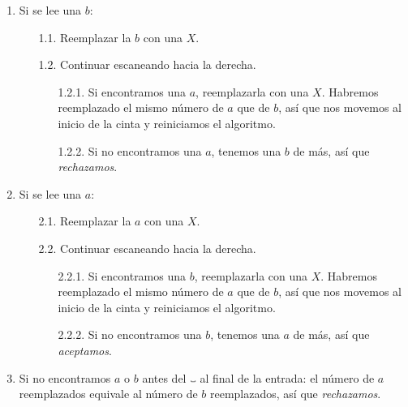 \begin{ejemplo}
\begin{enumerate}
    \item Si se lee una $b$:
        \begin{enumerate}
            \item[1.1.] Reemplazar la $b$ con una $X$.
            \item[1.2.] Continuar escaneando hacia la derecha.
            \begin{enumerate}
                \item[1.2.1.] Si encontramos una $a$, reemplazarla con una $X$. Habremos reemplazado el mismo número de $a$ que de $b$, así que nos movemos al inicio de la cinta y reiniciamos el algoritmo.
                \item[1.2.2.] Si no encontramos una $a$, tenemos una $b$ de más, así que \textit{rechazamos}.
            \end{enumerate}
        \end{enumerate}
    \item Si se lee una $a$:
        \begin{enumerate}
            \item[2.1.] Reemplazar la $a$ con una $X$.
            \item[2.2.] Continuar escaneando hacia la derecha.
            \begin{enumerate}
                \item[2.2.1.] Si encontramos una $b$, reemplazarla con una $X$. Habremos reemplazado el mismo número de $a$ que de $b$, así que nos movemos al inicio de la cinta y reiniciamos el algoritmo.
                \item[2.2.2.] Si no encontramos una $b$, tenemos una $a$ de más, así que \textit{aceptamos}.
            \end{enumerate}
        \end{enumerate}
    \item Si no encontramos $a$ o $b$ antes del $\Vtextvisiblespace$ al final de la entrada: el número de $a$ reemplazados equivale al número de $b$ reemplazados, así que \textit{rechazamos}.
\end{enumerate}



\end{ejemplo}
